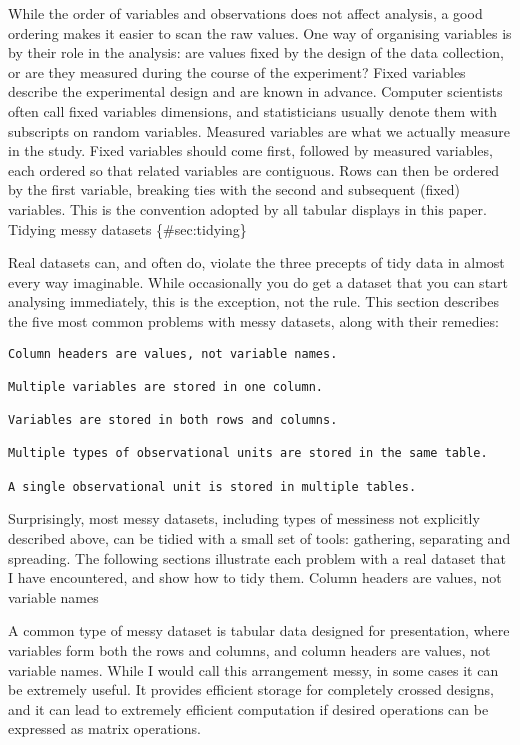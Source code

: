 \documentclass[]{article}
\begin{document}
While the order of variables and observations does not affect analysis,
a good ordering makes it easier to scan the raw values. One way of
organising variables is by their role in the analysis: are values fixed
by the design of the data collection, or are they measured during the
course of the experiment? Fixed variables describe the experimental
design and are known in advance. Computer scientists often call fixed
variables dimensions, and statisticians usually denote them with
subscripts on random variables. Measured variables are what we actually
measure in the study. Fixed variables should come first, followed by
measured variables, each ordered so that related variables are
contiguous. Rows can then be ordered by the first variable, breaking
ties with the second and subsequent (fixed) variables. This is the
convention adopted by all tabular displays in this paper. Tidying messy
datasets \{\#sec:tidying\}

Real datasets can, and often do, violate the three precepts of tidy data
in almost every way imaginable. While occasionally you do get a dataset
that you can start analysing immediately, this is the exception, not the
rule. This section describes the five most common problems with messy
datasets, along with their remedies:

\begin{verbatim}
Column headers are values, not variable names.

Multiple variables are stored in one column.

Variables are stored in both rows and columns.

Multiple types of observational units are stored in the same table.

A single observational unit is stored in multiple tables.
\end{verbatim}

Surprisingly, most messy datasets, including types of messiness not
explicitly described above, can be tidied with a small set of tools:
gathering, separating and spreading. The following sections illustrate
each problem with a real dataset that I have encountered, and show how
to tidy them. Column headers are values, not variable names

A common type of messy dataset is tabular data designed for
presentation, where variables form both the rows and columns, and column
headers are values, not variable names. While I would call this
arrangement messy, in some cases it can be extremely useful. It provides
efficient storage for completely crossed designs, and it can lead to
extremely efficient computation if desired operations can be expressed
as matrix operations.
\end{document}
